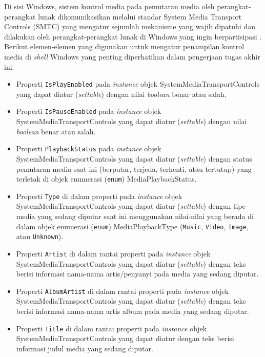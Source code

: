 Di sisi Windows, sistem kontrol media pada pemutaran media oleh perangkat-perangkat lunak 
dikomunikasikan melalui standar System Media Transport Controls (SMTC) yang mengatur sejumlah mekanisme yang wajib dipatuhi dan dilakukan oleh perangkat-perangkat lunak di Windows yang ingin berpartisipasi \cite{microsoft-docs-manual-control-of-the-smtc}. Berikut elemen-elemen yang digunakan untuk mengatur penampilan kontrol media di \textit{shell} Windows yang penting diperhatikan dalam pengerjaan tugas akhir ini.
\begin{itemize}
    \item Properti \verb|IsPlayEnabled| pada \textit{instance} objek SystemMediaTransportControls yang dapat diatur (\textit{settable}) dengan nilai \textit{boolean} benar atau salah.
    
    \item Properti \verb|IsPauseEnabled| pada \textit{instance} objek SystemMediaTransportControls yang dapat diatur (\textit{settable}) dengan nilai \textit{boolean} benar atau salah.
    
    \item Properti \verb|PlaybackStatus| pada \textit{instance} objek SystemMediaTransportControls yang dapat diatur (\textit{settable}) dengan status pemutaran media saat ini (berputar, terjeda, terhenti, atau tertutup) yang terletak di objek enumerasi (\verb|enum|) MediaPlaybackStatus.
    
    \item Properti \verb|Type| di dalam properti  pada \textit{instance} objek SystemMediaTransportControls yang dapat diatur (\textit{settable}) dengan tipe media yang sedang diputar saat ini menggunakan nilai-nilai yang berada di dalam objek enumerasi (\verb|enum|) MediaPlaybackType (\verb|Music|, \verb|Video|, \verb|Image|, atau \verb|Unknown|).
    
    \item Properti \verb|Artist| di dalam rantai properti  pada \textit{instance} objek SystemMediaTransportControls yang dapat diatur (\textit{settable}) dengan teks berisi informasi nama-nama artis/penyanyi pada media yang sedang diputar.
    
    \item Properti \verb|AlbumArtist| di dalam rantai properti  pada \textit{instance} objek SystemMediaTransportControls yang dapat diatur (\textit{settable}) dengan teks berisi informasi nama-nama artis album pada media yang sedang diputar.
    
    \item Properti \verb|Title| di dalam rantai properti  pada \textit{instance} objek SystemMediaTransportControls yang dapat diatur dengan teks berisi informasi judul media yang sedang diputar.

\end{itemize}

